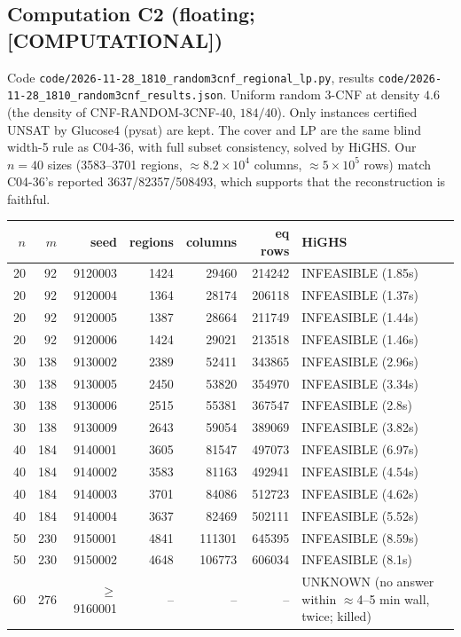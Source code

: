 \documentclass[11pt]{article}
\theoremstyle{remark}
\newcommand{\lab}[1]{\textbf{[#1]}}
\begin{document}
\subsection{Computation C2 (floating; \lab{COMPUTATIONAL})}
Code \texttt{code/2026-11-28\_1810\_random3cnf\_regional\_lp.py}, results \texttt{code/2026-11-28\_1810\_random3cnf\_results.json}.
Uniform random 3-CNF at density $4.6$ (the density of CNF-RANDOM-3CNF-40, $184/40$). Only
instances certified UNSAT by Glucose4 (pysat) are kept. The cover and LP are the same blind width-5 rule as
C04-36, with full subset consistency, solved by HiGHS. Our $n=40$ sizes (3583--3701 regions,
$\approx 8.2\times10^4$ columns, $\approx 5\times10^5$ rows) match C04-36's reported
3637/82357/508493, which supports that the reconstruction is faithful.
\begin{center}\begin{tabular}{rrrrrrl}\toprule
$n$ & $m$ & seed & regions & columns & eq rows & HiGHS\\\midrule
20 & 92 & 9120003 & 1424 & 29460 & 214242 & INFEASIBLE (1.85s)\\
20 & 92 & 9120004 & 1364 & 28174 & 206118 & INFEASIBLE (1.37s)\\
20 & 92 & 9120005 & 1387 & 28664 & 211749 & INFEASIBLE (1.44s)\\
20 & 92 & 9120006 & 1424 & 29021 & 213518 & INFEASIBLE (1.46s)\\
30 & 138 & 9130002 & 2389 & 52411 & 343865 & INFEASIBLE (2.96s)\\
30 & 138 & 9130005 & 2450 & 53820 & 354970 & INFEASIBLE (3.34s)\\
30 & 138 & 9130006 & 2515 & 55381 & 367547 & INFEASIBLE (2.8s)\\
30 & 138 & 9130009 & 2643 & 59054 & 389069 & INFEASIBLE (3.82s)\\
40 & 184 & 9140001 & 3605 & 81547 & 497073 & INFEASIBLE (6.97s)\\
40 & 184 & 9140002 & 3583 & 81163 & 492941 & INFEASIBLE (4.54s)\\
40 & 184 & 9140003 & 3701 & 84086 & 512723 & INFEASIBLE (4.62s)\\
40 & 184 & 9140004 & 3637 & 82469 & 502111 & INFEASIBLE (5.52s)\\
50 & 230 & 9150001 & 4841 & 111301 & 645395 & INFEASIBLE (8.59s)\\
50 & 230 & 9150002 & 4648 & 106773 & 606034 & INFEASIBLE (8.1s)\\
60 & 276 & $\ge$9160001 & -- & -- & -- & UNKNOWN (no answer within $\approx$4--5 min wall, twice; killed)\\
\bottomrule\end{tabular}\end{center}
\end{document}
